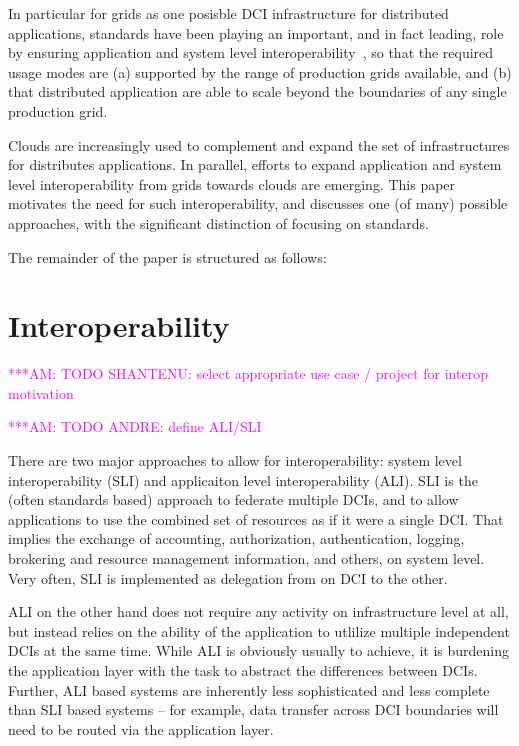 \documentclass[10pt,conference,final,letterpaper,twoside,twocolumn,]{IEEEtran}
\newcommand{\amnote}[1]{  {\textcolor{magenta} {***AM: #1}}}
\newcommand{\amnote}[1]{}
\begin{document}
 In particular for grids as one posisble DCI infrastructure for
 distributed applications, standards have been playing an important,
 and in fact leading, role by ensuring application and system level
 interoperability~\cite{gin,saga-gin}, so that the required usage
 modes are (a) supported by the range of production grids available,
 and (b) that distributed application are able to scale beyond the
 boundaries of any single production grid.

 Clouds are increasingly used to complement and expand the set of
 infrastructures for distributes applications.  In parallel, efforts
 to expand application and system level interoperability from grids
 towards clouds are emerging.  This paper motivates the need for such
 interoperability, and discusses one (of many) possible approaches,
 with the significant distinction of focusing on standards.

 The remainder of the paper is structured as follows: 


\section{Interoperability}
\label{sec:interop}

 \amnote{TODO SHANTENU: select appropriate use case / project for
 interop motivation}

 \amnote{TODO ANDRE: define ALI/SLI}


 There are two major approaches to allow for interoperability: system
 level interoperability (SLI) and applicaiton level interoperability
 (ALI).  SLI is the (often standards based) approach to federate
 multiple DCIs, and to allow applications to use the combined set of
 resources as if it were a single DCI.  That implies the exchange of
 accounting, authorization, authentication, logging, brokering and
 resource management information, and others, on system level.  Very
 often, SLI is implemented as delegation from on DCI to the other.

 ALI on the other hand does not require any activity on infrastructure
 level at all, but instead relies on the ability of the application to
 utlilize multiple independent DCIs at the same time.  While ALI is
 obviously usually to achieve, it is burdening the application layer
 with the task to abstract the differences between DCIs.  Further, ALI
 based systems are inherently less sophisticated and less complete
 than SLI based systems -- for example, data transfer across DCI
 boundaries will need to be routed via the application layer.
\end{document}

